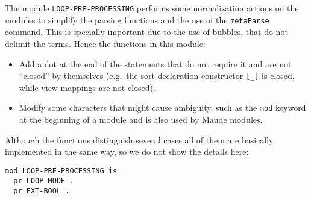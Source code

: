 The module \verb"LOOP-PRE-PROCESSING" performs some normalization actions on
the modules to simplify the parsing functions and the use of the \verb"metaParse"
command. This is specially important due to the use of bubbles, that do not delimit
the terms. Hence the functions in this module:
\begin{itemize}
\item
Add a dot at the end of the statements that do not require it and are not ``closed''
by themselves (e.g.\ the sort declaration constructor \verb"[_]" is closed, while
view mappings are not closed).

\item
Modify some characters that might cause ambiguity, such as the \verb"mod" keyword
at the beginning of a module and is also used by Maude modules.
\end{itemize}

Although the functions distinguish several cases all of them are basically implemented
in the same way, so we do not show the details here:

{\codesize
\begin{verbatim}
mod LOOP-PRE-PROCESSING is
  pr LOOP-MODE .
  pr EXT-BOOL .
\end{verbatim}
}
{\codesize
\begin{comment}
  vars Q Q' : Qid .
  vars QIL QIL' QIL'' QIL2 QIL3 : QidList .
  var  S : State .
  var  N : Nat .
\end{comment}
}

